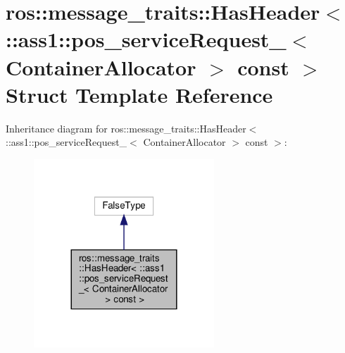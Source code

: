 \hypertarget{structros_1_1message__traits_1_1HasHeader_3_01_1_1ass1_1_1pos__serviceRequest___3_01ContainerAllocator_01_4_01const_01_4}{}\section{ros\+:\+:message\+\_\+traits\+:\+:Has\+Header$<$ \+:\+:ass1\+:\+:pos\+\_\+service\+Request\+\_\+$<$ Container\+Allocator $>$ const $>$ Struct Template Reference}
\label{structros_1_1message__traits_1_1HasHeader_3_01_1_1ass1_1_1pos__serviceRequest___3_01ContainerAllocator_01_4_01const_01_4}


Inheritance diagram for ros\+:\+:message\+\_\+traits\+:\+:Has\+Header$<$ \+:\+:ass1\+:\+:pos\+\_\+service\+Request\+\_\+$<$ Container\+Allocator $>$ const $>$\+:
\nopagebreak
\begin{figure}[H]
\begin{center}
\leavevmode
\includegraphics[width=192pt]{structros_1_1message__traits_1_1HasHeader_3_01_1_1ass1_1_1pos__serviceRequest___3_01ContainerAll22f960437c794d914ea2c70e028fa973}
\end{center}
\end{figure}


